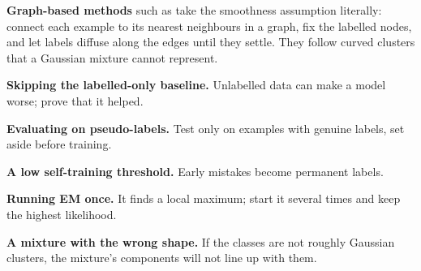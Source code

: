 \textbf{Graph-based methods} such as  take the smoothness
assumption literally: connect each example to its nearest neighbours in a graph, fix
the labelled nodes, and let labels diffuse along the edges until they settle. They
follow curved clusters that a Gaussian mixture cannot represent.

\begin{pitfall}
\begin{tight}
  \item \textbf{Skipping the labelled-only baseline.} Unlabelled data can make a
        model worse; prove that it helped.
  \item \textbf{Evaluating on pseudo-labels.} Test only on examples with genuine
        labels, set aside before training.
  \item \textbf{A low self-training threshold.} Early mistakes become permanent
        labels.
  \item \textbf{Running EM once.} It finds a local maximum; start it several times
        and keep the highest likelihood.
  \item \textbf{A mixture with the wrong shape.} If the classes are not roughly
        Gaussian clusters, the mixture's components will not line up with them.
\end{tight}
\end{pitfall}

